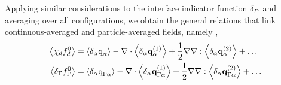 Applying similar considerations to the interface indicator function $\delta_\Gamma$, and averaging over all configurations, we obtain the general relations that link continuous-averaged and particle-averaged fields, namely \citep{lhuillier1992ensemble,lhuillier1998,lhuillier2000bilan}, 
\begin{align}
    \avg{\chi_df_d^0} 
    &=  \pavg{\text q_\alpha}
        - \div  
        \pavg{\textbf{q}_\alpha^{(1)}}        
        + \frac{1}{2} \grad\grad : \pavg{\textbf{q}_{\alpha}^{(2)}}
        + \ldots  \label{eq:f_exp_chi} \\
    \avg{\delta_\Gamma  f_\Gamma ^0} 
    &=  \pavg{\text q_{\Gamma \alpha}}        
        - \div \pavg{\textbf{q}_{\Gamma\alpha}^{(1)}}
        + \frac{1}{2} \grad\grad : \pavg{\textbf{q}_{\Gamma\alpha}^{(2)}}
        + \ldots  
    \label{eq:f_exp_delta}
\end{align}
